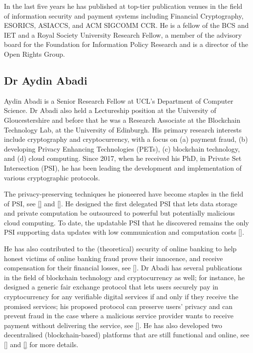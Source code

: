 In the last five years he has published at top-tier publication venues in the field of information security and payment systems including Financial Cryptography, ESORICS, ASIACCS, and ACM SIGCOMM CCR. He is a fellow of the BCS and IET and a Royal Society University Research Fellow, a member of the advisory board for the Foundation for Information Policy Research and is a director of the Open Rights Group.

\subsection{Dr Aydin Abadi}


Aydin Abadi is a Senior Research Fellow at UCL’s Department of Computer Science.  Dr Abadi also held a Lectureship position at the University of Gloucestershire and before that he was a Research Associate at the Blockchain Technology Lab, at the University of Edinburgh. His primary research interests include cryptography and cryptocurrency, with a focus on (a) payment fraud, (b) developing Privacy Enhancing Technologies (PETs), (c) blockchain technology, and (d) cloud computing. Since 2017, when he received his PhD, in Private Set Intersection (PSI), he has been leading the development and implementation of various cryptographic protocols. 

The privacy-preserving techniques he pioneered have become staples in the field of PSI, see \href{https://link.springer.com/chapter/10.1007/978-3-319-18467-8_1}{[\x]} and \href{https://link.springer.com/chapter/10.1007/978-3-662-54970-4_9}{[\x]}. He designed the first delegated PSI that lets data storage and private computation be outsourced to powerful but potentially malicious cloud computing. To date, the updatable PSI that he discovered remains the only PSI supporting data updates with low communication and computation costs \href{https://link.springer.com/chapter/10.1007/978-3-031-18283-9_6}{[\x]}.  


He has also contributed to the (theoretical) security of online banking to help honest victims of online banking fraud prove their innocence, and receive compensation for their financial losses, see \href{https://eprint.iacr.org/2022/107.pdf}{[\x]}. Dr Abadi has several publications in the field of blockchain technology and cryptocurrency as well; for instance, he designed a generic fair exchange protocol that lets users securely pay in cryptocurrency for any verifiable digital services if and only if they receive the promised services; his proposed protocol can preserve users' privacy and can prevent fraud in the case where a malicious service provider wants to receive payment without delivering the service, see \href{https://arxiv.org/pdf/2208.00283.pdf}{[\x]}. He has also developed two decentralised (blockchain-based) platforms that are still functional and online, see \href{http://blockchainlab.inf.ed.ac.uk/id-management/#/}{[\x]} and \href{http://blockchainlab.inf.ed.ac.uk/valued/}{[\x]} for more details.


